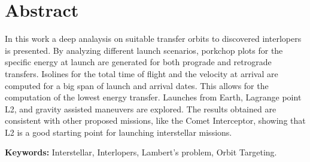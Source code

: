 \chapter*{Abstract}

In this work a deep analaysis on suitable transfer orbits to discovered
interlopers is presented. By analyzing different launch scenarios, porkchop
plots for the specific energy at launch are generated for both prograde and
retrograde transfers. Isolines for the total time of flight and the velocity at
arrival are computed for a big span of launch and arrival dates. This allows for
the computation of the lowest energy transfer. Launches from Earth, Lagrange
point L2, and gravity assisted maneuvers are explored. The results obtained are
consistent with other proposed missions, like the Comet Interceptor, showing
that L2 is a good starting point for launching interstellar missions.



\vspace{4cm}
\textbf{Keywords:} Interstellar, Interlopers, Lambert's problem, Orbit Targeting.
